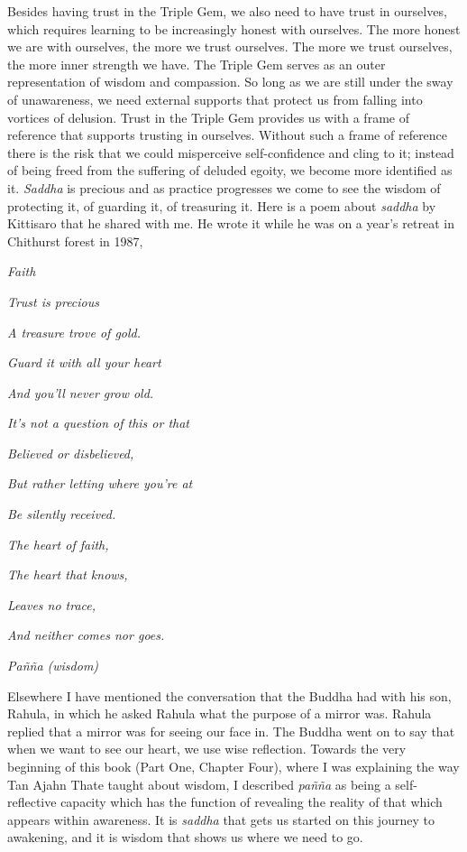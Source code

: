 Besides having trust in the Triple Gem, we also need to have trust in
ourselves, which requires learning to be increasingly honest with
ourselves. The more honest we are with ourselves, the more we trust
ourselves. The more we trust ourselves, the more inner strength we have.
The Triple Gem serves as an outer representation of wisdom and
compassion. So long as we are still under the sway of unawareness, we
need external supports that protect us from falling into vortices of
delusion. Trust in the Triple Gem provides us with a frame of reference
that supports trusting in ourselves. Without such a frame of reference
there is the risk that we could misperceive self-confidence and cling to
it; instead of being freed from the suffering of deluded egoity, we
become more identified as it. \emph{Saddha} is precious and as practice
progresses we come to see the wisdom of protecting it, of guarding it,
of treasuring it. Here is a poem about \emph{saddha} by Kittisaro that
he shared with me. He wrote it while he was on a year's retreat in
Chithurst forest in 1987,

\emph{Faith}

\emph{Trust is precious}

\emph{A treasure trove of gold.}

\emph{Guard it with all your heart}

\emph{And you'll never grow old.}

\emph{It's not a question of this or that}

\emph{Believed or disbelieved,}

\emph{But rather letting where you're at}

\emph{Be silently received.}

\emph{The heart of faith,}

\emph{The heart that knows,}

\emph{Leaves no trace,}

\emph{And neither comes nor goes.}

\emph{Pañña (wisdom)}

Elsewhere I have mentioned the conversation that the Buddha had with his
son, Rahula, in which he asked Rahula what the purpose of a mirror was.
Rahula replied that a mirror was for seeing our face in. The Buddha went
on to say that when we want to see our heart, we use wise reflection.
Towards the very beginning of this book (Part One, Chapter Four), where
I was explaining the way Tan Ajahn Thate taught about wisdom, I
described \emph{pañña} as being a self-reflective capacity which has the
function of revealing the reality of that which appears within
awareness. It is \emph{saddha} that gets us started on this journey to
awakening, and it is wisdom that shows us where we need to go.

